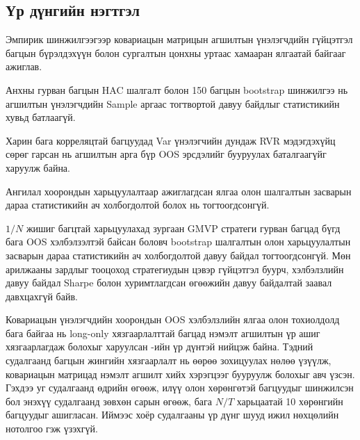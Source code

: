 \subsection{Үр дүнгийн нэгтгэл}
\label{subsec:results_summary}

Эмпирик шинжилгээгээр ковариацын
матрицын агшилтын үнэлэгчдийн
гүйцэтгэл багцын бүрэлдэхүүн болон
сургалтын цонхны уртаас хамааран
ялгаатай байгааг ажиглав.

Анхны гурван багцын HAC шалгалт
болон 150 багцын bootstrap шинжилгээ
нь агшилтын үнэлэгчдийн Sample
аргаас тогтвортой давуу байдлыг
статистикийн хувьд батлаагүй.

Харин бага корреляцтай багцуудад
Var үнэлэгчийн дундаж RVR
мэдэгдэхүйц сөрөг гарсан нь
агшилтын арга бүр OOS эрсдэлийг
бууруулах баталгаагүйг харуулж байна.

Ангилал хоорондын харьцуулалтаар
ажиглагдсан ялгаа олон шалгалтын
засварын дараа статистикийн
ач холбогдолтой болох нь
тогтоогдсонгүй.

$1/N$ жишиг багцтай харьцуулахад
зургаан GMVP стратеги гурван багцад
бүгд бага OOS хэлбэлзэлтэй байсан
боловч bootstrap шалгалтын
олон харьцуулалтын засварын дараа
статистикийн ач холбогдолтой давуу
байдал тогтоогдсонгүй. Мөн
арилжааны зардлыг тооцоход
стратегиудын цэвэр гүйцэтгэл
буурч, хэлбэлзлийн давуу байдал
Sharpe болон хуримтлагдсан
өгөөжийн давуу байдалтай
заавал давхцахгүй байв.

Ковариацын үнэлэгчдийн хоорондын OOS хэлбэлзлийн
ялгаа олон тохиолдолд бага байгаа нь long-only
хязгаарлалттай багцад нэмэлт агшилтын үр ашиг
хязгаарлагдаж болохыг харуулсан
\citet{DeNardKostovic2026}-ийн үр дүнтэй
нийцэж байна. Тэдний судалгаанд багцын жингийн
хязгаарлалт нь өөрөө зохицуулах нөлөө үзүүлж,
ковариацын матрицад нэмэлт агшилт хийх хэрэгцээг
бууруулж болохыг авч үзсэн. Гэхдээ уг судалгаанд
өдрийн өгөөж, илүү олон хөрөнгөтэй багцуудыг
шинжилсэн бол энэхүү судалгаанд зөвхөн сарын
өгөөж, бага $N/T$ харьцаатай 10 хөрөнгийн
багцуудыг ашигласан. Иймээс хоёр судалгааны
үр дүнг шууд ижил нөхцөлийн нотолгоо гэж үзэхгүй.
